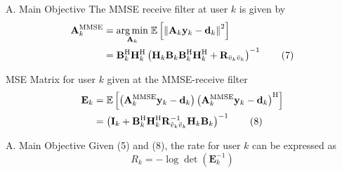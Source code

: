 \documentclass[aspectratio=169, 10pt]{beamer}
\begin{document}
\begin{frame}[label=main-mmse_rx_filter]{A. Main Objective}
    The MMSE receive filter at user $k$ is given by
    \begin{align}
        \mathbf{A}_k^{\mathrm{MMSE}}
         & =\underset{\mathbf{A}_k}{\arg \min }\;
        \mathbb{E}\left[\left\|\mathbf{A}_k \mathbf{y}_k-\mathbf{d}_k\right\|^2\right] \notag                                                                                                           \\
         & =\mathbf{B}_k^{\mathrm{H}} \mathbf{H}_k^{\mathrm{H}}\left(\mathbf{H}_k \mathbf{B}_k \mathbf{B}_k^{\mathrm{H}} \mathbf{H}_k^{\mathrm{H}}+\mathbf{R}_{\bar{v}_k \bar{v}_k}\right)^{-1} \tag{7}
    \end{align}
    \begin{flushright}
        \hyperlink{app-mmse_rx_filter_7}{}
    \end{flushright}

    MSE Matrix for user $k$ given at the MMSE-receive filter
    \begin{align}
        \mathbf{E}_k & =\mathbb{E}\left[\left(\mathbf{A}_k^{\mathrm{MMSE}} \mathbf{y}_k-\mathbf{d}_k\right)\left(\mathbf{A}_k^{\mathrm{MMSE}} \mathbf{y}_k-\mathbf{d}_k\right)^{\mathrm{H}}\right] \notag \\
                     & =\left(\mathbf{I}_k+\mathbf{B}_k^{\mathrm{H}} \mathbf{H}_k^{\mathrm{H}} \mathbf{R}_{\tilde{v}_k \tilde{v}_k}^{-1} \mathbf{H}_k \mathbf{B}_k\right)^{-1}  \tag{8}
    \end{align}

    \begin{flushright}
        \hyperlink{app-mmse_rx_filter_8}{}
    \end{flushright}
\end{frame}

\begin{frame}{A. Main Objective}
    Given (5) and (8), the rate for user $k$ can be expressed as
    \begin{equation}
        R_k = -\log \operatorname{det}(\mathbf{E}_k^{-1}) \tag{9}
    \end{equation}
\end{frame}


\end{document}
